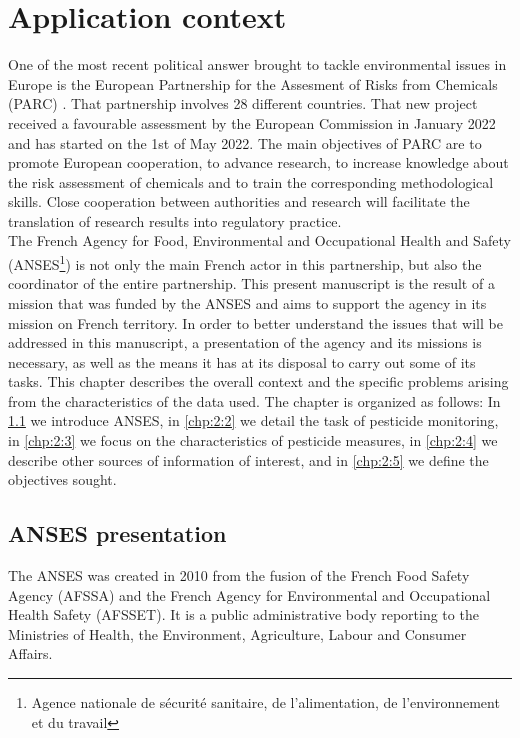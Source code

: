 \chapter{Application context}\label{chp:2}

\minitoc

\clearpage

One of the most recent political answer brought to tackle environmental issues in Europe is the European Partnership for the Assesment of Risks from Chemicals (PARC) \cite{PARC}. That partnership involves 28 different countries. That new project received a favourable assessment by the European Commission in January 2022 and has started on the 1st of May 2022. The main objectives of PARC are to promote European cooperation, to advance research, to increase knowledge about the risk assessment of chemicals and to train the corresponding methodological skills. Close cooperation between authorities and research will facilitate the translation of research results into regulatory practice. \\
The French Agency for Food, Environmental and Occupational Health and Safety (ANSES\footnote{Agence nationale de sécurité sanitaire, de l'alimentation, de l'environnement et du travail}) is not only the main French actor in this partnership, but also the coordinator of the entire partnership. This present manuscript is the result of a mission that was funded by the ANSES and aims to support the agency in its mission on French territory. In order to better understand the issues that will be addressed in this manuscript, a presentation of the agency and its missions is necessary, as well as the means it has at its disposal to carry out some of its tasks. This chapter describes the overall context and the specific problems arising from the characteristics of the data used. The chapter is organized as follows: In \ref{chp:2:1} we introduce ANSES, in \ref{chp:2:2} we detail the task of pesticide monitoring, in \ref{chp:2:3} we focus on the characteristics of pesticide measures, in \ref{chp:2:4} we describe other sources of information of interest, and in \ref{chp:2:5} we define the objectives sought.    

\section{ANSES presentation}\label{chp:2:1}

The ANSES was created in 2010 from the fusion of the French Food Safety Agency (AFSSA) and the French Agency for Environmental and Occupational Health Safety (AFSSET). It is a public administrative body reporting to the Ministries of Health, the Environment, Agriculture, Labour and Consumer Affairs.  

